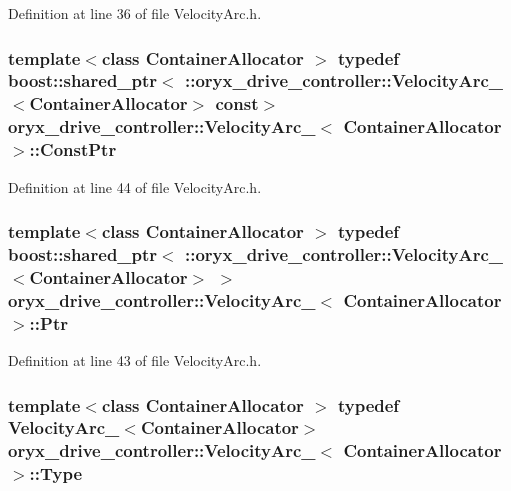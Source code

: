 \-Definition at line 36 of file \-Velocity\-Arc.\-h.

\subsubsection[{\-Const\-Ptr}]{\setlength{\rightskip}{0pt plus 5cm}template$<$class Container\-Allocator $>$ typedef boost\-::shared\-\_\-ptr$<$ \-::{\bf oryx\-\_\-drive\-\_\-controller\-::\-Velocity\-Arc\-\_\-}$<$\-Container\-Allocator$>$ const$>$ {\bf oryx\-\_\-drive\-\_\-controller\-::\-Velocity\-Arc\-\_\-}$<$ \-Container\-Allocator $>$\-::{\bf \-Const\-Ptr}}\label{structoryx__drive__controller_1_1VelocityArc___a609bf4ef02b5410e78043cd52359b2e7}


\-Definition at line 44 of file \-Velocity\-Arc.\-h.

\subsubsection[{\-Ptr}]{\setlength{\rightskip}{0pt plus 5cm}template$<$class Container\-Allocator $>$ typedef boost\-::shared\-\_\-ptr$<$ \-::{\bf oryx\-\_\-drive\-\_\-controller\-::\-Velocity\-Arc\-\_\-}$<$\-Container\-Allocator$>$ $>$ {\bf oryx\-\_\-drive\-\_\-controller\-::\-Velocity\-Arc\-\_\-}$<$ \-Container\-Allocator $>$\-::{\bf \-Ptr}}\label{structoryx__drive__controller_1_1VelocityArc___ab23812b3d02bd6b7ba82e69c7c27de09}


\-Definition at line 43 of file \-Velocity\-Arc.\-h.

\subsubsection[{\-Type}]{\setlength{\rightskip}{0pt plus 5cm}template$<$class Container\-Allocator $>$ typedef {\bf \-Velocity\-Arc\-\_\-}$<$\-Container\-Allocator$>$ {\bf oryx\-\_\-drive\-\_\-controller\-::\-Velocity\-Arc\-\_\-}$<$ \-Container\-Allocator $>$\-::{\bf \-Type}}\label{structoryx__drive__controller_1_1VelocityArc___a10c5e78213419312962aa2a8dee21885}


